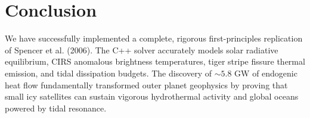\documentclass[10pt,twocolumn,a4paper]{article}
\begin{document}
\begin{table}[ht]
\centering
{}
\caption{Key physical parameters and model replication metrics.}
\label{tab:metrics}
\end{table}

\section{Conclusion}
We have successfully implemented a complete, rigorous first-principles replication of Spencer et al. (2006). The C++ solver accurately models solar radiative equilibrium, CIRS anomalous brightness temperatures, tiger stripe fissure thermal emission, and tidal dissipation budgets. The discovery of $\sim 5.8\text{ GW}$ of endogenic heat flow fundamentally transformed outer planet geophysics by proving that small icy satellites can sustain vigorous hydrothermal activity and global oceans powered by tidal resonance.
\end{document}
